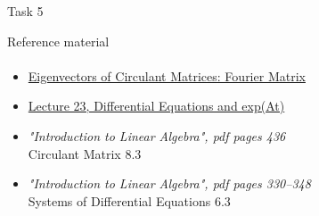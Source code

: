 \documentclass[aspectratio=169]{beamer}
\newcommand{\fbckg}[1]{\usebackgroundtemplate{\texttt{[image: \#1]}}}%
\begin{document}
\begin{frame}[t]{Task 5}
{\begin{enumerate}
        \end{enumerate}
    }
\end{frame}


\begin{frame}[t]{Reference material}
    \framesubtitle{}
    \Large
    \begin{itemize}
        \item \href{https://youtu.be/1pFv7e9xtHo}{Eigenvectors of Circulant Matrices: Fourier Matrix} \label{itm:circulant}
        \item \href{https://www.youtube.com/watch?v=IZqwi0wJovM&list=PL49CF3715CB9EF31D&index=23}{Lecture 23, Differential Equations and exp(At)}
        \item \textit{"Introduction to Linear Algebra", pdf pages 436 }\\ Circulant Matrix 8.3
        \item \textit{"Introduction to Linear Algebra", pdf pages 330--348 }\\ Systems of Differential Equations 6.3
    \end{itemize}
\end{frame}

\fbckg{fibeamer/figs/last_page.png}
\frame[plain]{}
\end{document}
